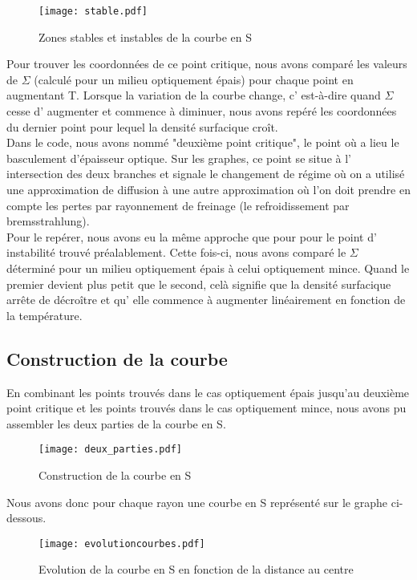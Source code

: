 \begin{figure}[htb!]
	\centering
	\texttt{[image: stable.pdf]}
	\caption{Zones stables et instables de la courbe en S}
	\label{Fig::bench}
\end{figure}

Pour trouver les coordonnées de ce point critique, nous avons comparé les valeurs de $\Sigma$ (calculé pour un milieu optiquement épais) pour chaque point en augmentant T. Lorsque la variation de la courbe change, c' est-à-dire quand $\Sigma$ cesse d' augmenter et commence à diminuer, nous avons repéré les coordonnées du dernier point pour lequel la densité surfacique croît.  
\\
Dans le code, nous avons nommé "deuxième point critique", le point où a lieu le basculement d'épaisseur optique. Sur les graphes, ce point se situe à l' intersection des deux branches et signale le changement de régime où on a utilisé une approximation de diffusion à une autre approximation où l'on doit prendre en compte les pertes par rayonnement de freinage (le refroidissement par bremsstrahlung).
\\
Pour le repérer, nous avons eu la même approche que pour pour le point d' instabilité trouvé préalablement. Cette fois-ci, nous avons comparé le $\Sigma$ déterminé pour un milieu optiquement épais à celui optiquement mince. Quand le premier devient plus petit que le second, celà signifie que la densité surfacique arrête de décroître et qu' elle commence à augmenter linéairement en fonction de la température. 
\\

\subsection{Construction de la courbe}

En combinant les points trouvés dans le cas optiquement épais jusqu'au deuxième point critique et les points trouvés dans le cas optiquement mince, nous avons pu assembler les deux parties de la courbe en S.

\begin{figure}[htb!]
	\centering
	\texttt{[image: deux\_parties.pdf]}
	\caption{Construction de la courbe en S}
	\label{Fig::bench}
\end{figure}


Nous avons donc pour chaque rayon une courbe en S représenté sur le graphe ci-dessous.
\begin{figure}[htb!]
	\centering
	\texttt{[image: evolutioncourbes.pdf]}
	\caption{Evolution de la courbe en S en fonction de la distance au centre}
	\label{Fig::bench}
\end{figure}



